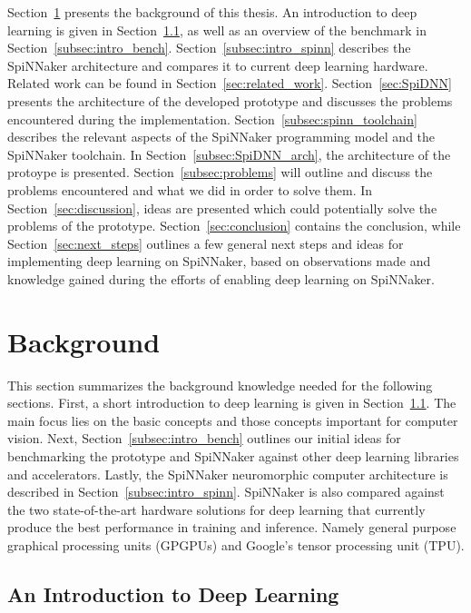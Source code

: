 \documentclass[]{article}
\begin{document}
Section~\ref{sec:background} presents the background of this thesis.
An introduction to deep learning is given in
Section~\ref{subsec:intro_dl}, as well as an overview
of the benchmark in Section~\ref{subsec:intro_bench}.
Section~\ref{subsec:intro_spinn} describes the SpiNNaker architecture
and compares it to current deep learning hardware.
Related work can be found in Section~\ref{sec:related_work}.
Section~\ref{sec:SpiDNN} presents the architecture of the
developed prototype and discusses the problems encountered during
the implementation.
Section~\ref{subsec:spinn_toolchain} describes the relevant aspects
of the SpiNNaker programming model and the SpiNNaker toolchain.
In Section~\ref{subsec:SpiDNN_arch}, the architecture of the protoype
is presented.
Section~\ref{subsec:problems} will outline and discuss the problems
encountered and what we did in order to solve them.
In Section~\ref{sec:discussion}, ideas are presented which could
potentially solve the problems of the prototype.
Section~\ref{sec:conclusion} contains the conclusion, while
Section~\ref{sec:next_steps} outlines a few general next steps and
ideas for implementing deep learning on SpiNNaker, based on
observations made and knowledge gained during the efforts of enabling
deep learning on SpiNNaker.



\section{Background} %
\label{sec:background}

This section summarizes the background knowledge needed for the
following sections.
First, a short introduction to deep learning is given in
Section~\ref{subsec:intro_dl}.
The main focus lies on the basic concepts and those concepts important
for computer vision.
Next, Section~\ref{subsec:intro_bench} outlines our initial ideas for
benchmarking the prototype and SpiNNaker against other deep learning
libraries and accelerators.
Lastly, the SpiNNaker neuromorphic computer architecture is described
in Section~\ref{subsec:intro_spinn}.
SpiNNaker is also compared against the two state-of-the-art hardware
solutions for deep learning that currently produce the best
performance in training and inference.
Namely general purpose graphical processing units (GPGPUs) and
Google's tensor processing unit (TPU).


\subsection{An Introduction to Deep Learning} %
\label{subsec:intro_dl}
\end{document}
